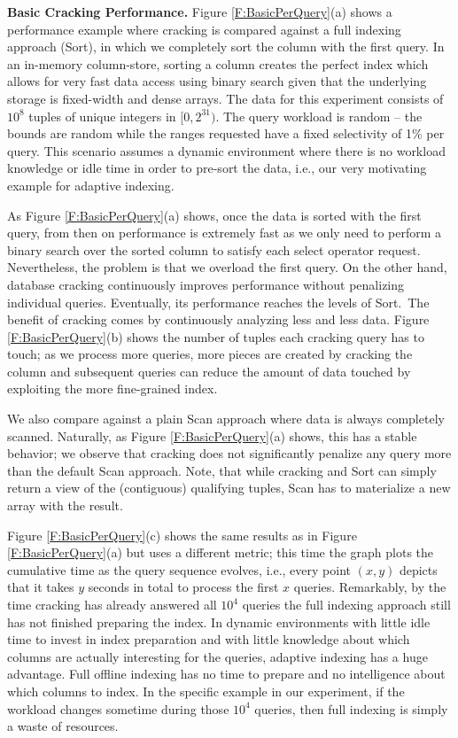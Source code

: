 \textbf{Basic Cracking Performance.}
Figure \ref{F:BasicPerQuery}(a) shows a performance example where cracking is compared against
a full indexing approach ({\sf Sort}), in which we completely sort the column with the first query.
In an in-memory column-store, sorting a column creates the perfect index which allows for very fast
data access using binary search given that the underlying storage is 
fixed-width and dense arrays.
The data for this experiment consists of $10^8$ tuples of unique integers in $[0,2^{31})$.
The query workload is random -- the bounds are random while 
the ranges requested have a fixed selectivity of 1\% per query.
This scenario assumes a dynamic environment where there is no workload knowledge or idle time
in order to pre-sort the data, i.e., our very motivating example for adaptive indexing.


As Figure \ref{F:BasicPerQuery}(a) shows, once the data is sorted with the first query, from then on performance is
extremely fast as we only need to perform a binary search over the sorted column to satisfy each select operator request.
Nevertheless, the problem is that we overload the first query. On the other hand, database cracking
continuously improves performance without penalizing individual queries. Eventually, its performance reaches
the levels of {\sf Sort}.\
The benefit of cracking comes by continuously analyzing less and less data.
Figure \ref{F:BasicPerQuery}(b) shows the number of tuples each cracking query has to touch;
as we process more queries, more pieces are created by cracking the column and subsequent queries can 
reduce the amount of data touched by exploiting the more fine-grained index.

We also compare against a plain {\sf Scan} approach where data is always completely scanned. 
Naturally, as Figure \ref{F:BasicPerQuery}(a) shows, this has a stable behavior;
we observe that cracking does not significantly penalize any query more than the default {\sf Scan} approach.
Note, that while cracking and {\sf Sort} can simply return a view of the (contiguous)
qualifying tuples, {\sf Scan} has to materialize
a new array with the result. 

Figure \ref{F:BasicPerQuery}(c) shows the same results as in Figure \ref{F:BasicPerQuery}(a) but uses
a different metric; this time the graph plots the cumulative time as the query sequence evolves, i.e.,
every point $(x,y)$ depicts that it takes $y$ seconds in total to process the first $x$ queries.
Remarkably,  by the time cracking has already answered all $10^4$ queries
the full indexing approach still has not finished preparing the index. 
In dynamic environments with little idle time to invest in index preparation and with little knowledge
about which columns are actually interesting for the queries, adaptive indexing has a huge advantage.
Full offline indexing has no time to prepare and no intelligence  about which columns to index.
In the specific example in our experiment, if the workload changes sometime during those $10^4$ queries,
then full indexing is simply a waste of resources. 


